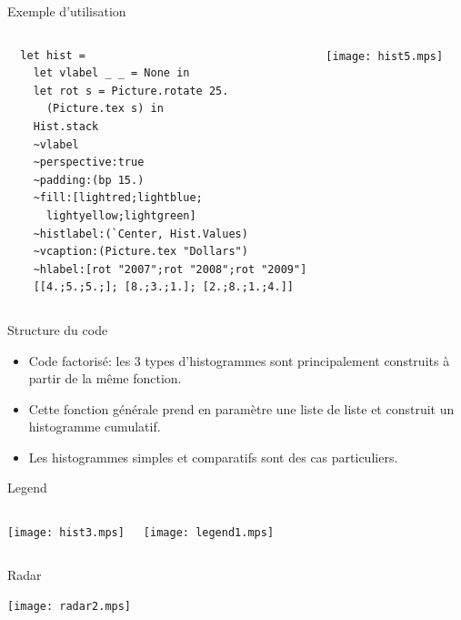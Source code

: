 \documentclass{beamer}
\begin{document}
\begin{frame}[fragile]{Exemple d'utilisation}
\begin{columns}
  \begin{center}\footnotesize{
\begin{verbatim}
  let hist =
    let vlabel _ _ = None in
    let rot s = Picture.rotate 25. 
      (Picture.tex s) in
    Hist.stack
    ~vlabel
    ~perspective:true 
    ~padding:(bp 15.)
    ~fill:[lightred;lightblue;
      lightyellow;lightgreen]
    ~histlabel:(`Center, Hist.Values)
    ~vcaption:(Picture.tex "Dollars")
    ~hlabel:[rot "2007";rot "2008";rot "2009"]
    [[4.;5.;5.;]; [8.;3.;1.]; [2.;8.;1.;4.]]
\end{verbatim}}
      \end{center}
    
    \begin{center}
      \texttt{[image: hist5.mps]}
    \end{center}
  \end{columns}
\end{frame}
    
\begin{frame}{Structure du code}
  \begin{itemize}
  \item Code factorisé: les 3 types d'histogrammes sont principalement construits à partir de la même fonction.
  
  \bigskip
  \item Cette fonction générale prend en paramètre une liste de liste et construit un histogramme cumulatif.
  
  \bigskip
  \item Les histogrammes simples et comparatifs sont des cas particuliers.
  \end{itemize}
\end{frame}


\begin{frame}{Legend}
  \begin{columns}
    \begin{center}
      \texttt{[image: hist3.mps]}
    \end{center}
     \texttt{[image: legend1.mps]}
  \end{columns}
\end{frame}

\begin{frame}{Radar}
  \begin{center}
    \texttt{[image: radar2.mps]}
  \end{center}
\end{frame}
\end{document}
